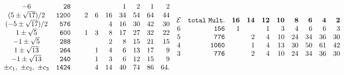 \documentclass[a4paper,12pt]{article}
\begin{document}
\begin{equation}
{\begin{array}{crrrrrrrrr}
-6      &       {\tt    28      }       &               &               &
&               &       1       &       2       &       1       &       2
\\
 (5\pm\sqrt{17})/2      &       {\tt    1200    }       &               &
 2       &       6       &       16      &       34      &       54      &
 64      &       44      \\
 (-5\pm\sqrt{17})/2     &       {\tt    576     }       &               &
 &               &       4       &       16      &       30      &       42
 &       30      \\
 1\pm\sqrt{5}   &       {\tt    600     }       &               &       1
 &       3       &       8       &       17      &       27      &       32
 &       22      \\
 -1\pm\sqrt{5}  &       {\tt    288     }       &               &
 &               &       2       &       8       &       15      &       21
 &       15      \\
 1\pm\sqrt{13}  &       {\tt    264     }       &               &
 &       1       &       4       &       6       &       13      &       17
 &       9       \\
-1 \pm\sqrt{13} &       {\tt    240     }       &               &
&       1       &       3       &       6       &       12      &       15
&       9       \\
 \pm c_1,\ \pm c_2,\ \pm c_3    &       {\tt    1424    }       &
 &               &       4       &       14      &       40      &       74
 &       86      &       64.
\end{array}
}{
\begin{array}{crrrrrrrrr}
{\cal E}&{\tt total\ Mult.}&{\bf 16}&{\bf14}&{\bf12}&{\bf10}&{\bf8}
&{\bf 6}&{\bf 4}&{\bf2}\\
6   & {\tt 156  }       &       1       &               &       1       &
3       &       4       &       6       &       6       &       3       \\
5       &       {\tt    776     }       &               &       2
&       4       &       10      &       24      &       34      &
36      &       30      \\
4       &       {\tt    1060    }       &               &       1
&       4       &       13      &       30      &       50      &
61      &       42      \\
3       &       {\tt    776     }       &               &       2
&       4       &       10      &       24      &       34      &
36      &       30      \\

\end{array}}
\end{equation}
\end{document}
